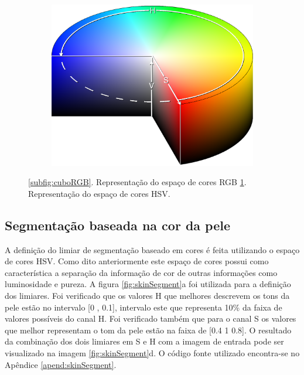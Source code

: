 \documentclass[
	article,			%
	11pt,				%
	oneside,			%
	a4paper,			%
	english,			%
	brazil,				%
	sumario=tradicional
	]{abntex2}
\begin{document}
\begin{figure}
\begin{subfigure}[b]{0.3\textwidth}
        \end{subfigure}%
        ~ %
        \begin{subfigure}[b]{0.3\textwidth}
                \includegraphics[width=\textwidth,scale=1]{imagens/ex4/HSVColorSpace.png}
                \caption{}
                \label{subfig:cilindoHSV}
        \end{subfigure}
        
        \caption{ 
        \ref{subfig:cuboRGB}. Representação do espaço de cores RGB
        \ref{subfig:cilindoHSV}. Representação do espaço de cores HSV.
        } 
	\label{fig:filtrosFrequencia}
\end{figure}

\subsection{Segmentação baseada na cor da pele}
A definição do limiar de segmentação baseado em cores é feita utilizando o
espaço de cores HSV. Como dito anteriormente este espaço de cores possui como
característica a separação da informação de cor de outras informações como
luminosidade e pureza. A figura \ref{fig:skinSegment}a foi utilizada para a
definição dos limiares. Foi verificado que os valores H que melhores descrevem
os tons da pele estão no intervalo [0 , 0.1], intervalo este que representa
10\% da faixa de valores possíveis do canal H. Foi verificado também que para o
canal S os valores que melhor representam o tom da pele estão na faixa de [0.4
1 0.8]. O resultado da combinação dos dois limiares em S e H com a imagem de
entrada pode ser visualizado na imagem \ref{fig:skinSegment}d.  O código
fonte utilizado encontra-se no Apêndice \ref{apend:skinSegment}.
\end{document}
